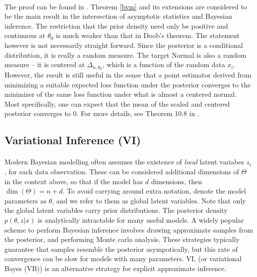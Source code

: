\paragraph{} The proof can be found in \cite{Asymptotics:2000}. Theorem \ref{bvm} and its extensions are considered to be the main result in the intersection of asymptotic statistics and Bayesian inference. The restriction that the prior density need only be positive and continuous at $\theta_0$ is much weaker than that in Doob's theorem. The statement however is not necessarily straight forward. Since the posterior is a conditional distribution, it is really a random measure. The target Normal is also a random measure -- it is centered at $\Delta_{n, \theta_0}$, which is a function of the random data $x_i$. However, the result is still useful in the sense that a point estimator derived from minimizing a suitable expected loss function under the posterior converges to the minimizer of the same loss function under what is almost a centered normal. Most specifically, one can expect that the mean of the scaled and centered posterior converges to 0. For more details, see Theorem 10.8 in \cite{Asymptotics:2000}.  
 
\subsection{Variational Inference (VI)}

\paragraph{} Modern Bayesian modelling often assumes the existence of \textit{local} latent variabes $z_i$, for each data observation. These can be considered additional dimensions of $\Theta$ in the context above, so that if the model has $d$ dimensions, then $\dim(\Theta) = n+d$. To avoid carrying around extra notation, denote the model parameters as $\theta$, and we refer to them as global latent variables. Note that only the global latent variables carry prior distributions. The posterior density $p(\theta,z |x)$ is analytically intractable for many useful models. A widely popular scheme to perform Bayesian inference involves drawing approximate samples from the posterior, and performing Monte carlo analysis. These strategies typically guarantee that samples resemble the posterior asympotically, but this rate of convergence can be slow for models with many parameters. VI, (or variational Bayes (VB)) is an alternative strategy for explicit approximate inference. 

